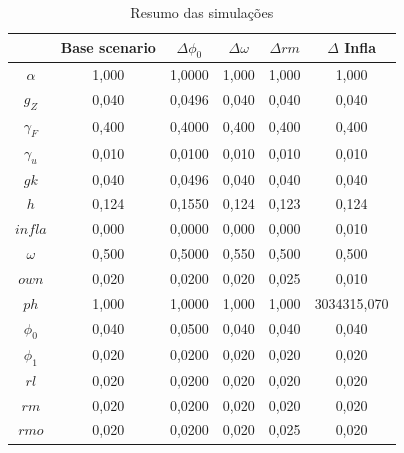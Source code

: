 \begin{table}[H]
    \centering
    \caption{Resumo das simulações}
    \label{Resumo_Simulacao}
         \begin{tabular}{cccccc}
	\toprule
{} &  Base scenario &  $\Delta \phi_0$ &  $\Delta \omega$ &  $\Delta rm$ &  $\Delta $ Infla \\
\midrule
\textbf{$\alpha$} &          1,000 &        1,0000 &            1,000 &        1,000 &            1,000 \\
\textbf{$g_Z$} &          0,040 &        0,0496 &            0,040 &        0,040 &            0,040 \\
\textbf{$\gamma_F$} &          0,400 &        0,4000 &            0,400 &        0,400 &            0,400 \\
\textbf{$\gamma_u$} &          0,010 &        0,0100 &            0,010 &        0,010 &            0,010 \\
\textbf{$gk$       } &          0,040 &        0,0496 &            0,040 &        0,040 &            0,040 \\
\textbf{$h$        } &          0,124 &        0,1550 &            0,124 &        0,123 &            0,124 \\
\textbf{$infla$    } &          0,000 &        0,0000 &            0,000 &        0,000 &            0,010 \\
\textbf{$\omega$    } &          0,500 &        0,5000 &            0,550 &        0,500 &            0,500 \\
\textbf{$own$      } &          0,020 &        0,0200 &            0,020 &        0,025 &            0,010 \\
\textbf{$ph$       } &          1,000 &        1,0000 &            1,000 &        1,000 &      3034315,070 \\
\textbf{$\phi_0$    } &          0,040 &        0,0500 &            0,040 &        0,040 &            0,040 \\
\textbf{$\phi_1$    } &          0,020 &        0,0200 &            0,020 &        0,020 &            0,020 \\
\textbf{$rl$       } &          0,020 &        0,0200 &            0,020 &        0,020 &            0,020 \\
\textbf{$rm$       } &          0,020 &        0,0200 &            0,020 &        0,020 &            0,020 \\
\textbf{$rmo$      } &          0,020 &        0,0200 &            0,020 &        0,025 &            0,020 \\

\end{tabular}
\end{table}
